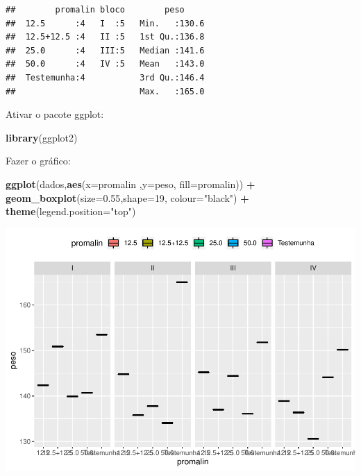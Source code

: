\documentclass[
]{book}
\newenvironment{Shaded}{\begin{snugshade}}{\end{snugshade}}
\newcommand{\DataTypeTok}[1]{\textcolor[rgb]{0.13,0.29,0.53}{#1}}
\newcommand{\DecValTok}[1]{\textcolor[rgb]{0.00,0.00,0.81}{#1}}
\newcommand{\FloatTok}[1]{\textcolor[rgb]{0.00,0.00,0.81}{#1}}
\newcommand{\KeywordTok}[1]{\textcolor[rgb]{0.13,0.29,0.53}{\textbf{#1}}}
\newcommand{\NormalTok}[1]{#1}
\newcommand{\OperatorTok}[1]{\textcolor[rgb]{0.81,0.36,0.00}{\textbf{#1}}}
\newcommand{\StringTok}[1]{\textcolor[rgb]{0.31,0.60,0.02}{#1}}
\begin{document}
\begin{verbatim}
##        promalin bloco        peso      
##  12.5      :4   I  :5   Min.   :130.6  
##  12.5+12.5 :4   II :5   1st Qu.:136.8  
##  25.0      :4   III:5   Median :141.6  
##  50.0      :4   IV :5   Mean   :143.0  
##  Testemunha:4           3rd Qu.:146.4  
##                         Max.   :165.0
\end{verbatim}

Ativar o pacote ggplot:

\begin{Shaded}
\begin{Highlighting}[]
\KeywordTok{library}\NormalTok{(ggplot2)}
\end{Highlighting}
\end{Shaded}

Fazer o gráfico:

\begin{Shaded}
\begin{Highlighting}[]
\KeywordTok{ggplot}\NormalTok{(dados,}\KeywordTok{aes}\NormalTok{(}\DataTypeTok{x=}\NormalTok{promalin ,}\DataTypeTok{y=}\NormalTok{peso, }\DataTypeTok{fill=}\NormalTok{promalin)) }\OperatorTok{+}\StringTok{ }
\StringTok{      }\KeywordTok{geom_boxplot}\NormalTok{(}\DataTypeTok{size=}\FloatTok{0.55}\NormalTok{,}\DataTypeTok{shape=}\DecValTok{19}\NormalTok{, }\DataTypeTok{colour=}\StringTok{"black"}\NormalTok{) }\OperatorTok{+}\StringTok{ }
\StringTok{      }\KeywordTok{theme}\NormalTok{(}\DataTypeTok{legend.position=}\StringTok{"top"}\NormalTok{) }
\end{Highlighting}
\end{Shaded}

\includegraphics{TudodoR_files/figure-latex/unnamed-chunk-234-1.pdf}
\end{document}
